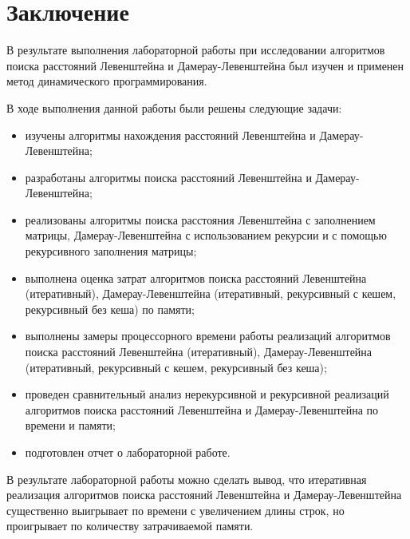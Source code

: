 \chapter*{Заключение}

В результате выполнения лабораторной работы при исследовании алгоритмов поиска расстояний Левенштейна и Дамерау-Левенштейна был изучен и применен метод динамического программирования.

В ходе выполнения данной работы были решены следующие задачи:

\begin{itemize}
    \item изучены алгоритмы нахождения расстояний Левенштейна и Дамерау-Левенштейна;
	\item разработаны алгоритмы поиска расстояний Левенштейна и Дамерау-Левенштейна;
	\item реализованы алгоритмы поиска расстояния Левенштейна с заполнением матрицы, Дамерау-Левенштейна с использованием рекурсии и с помощью рекурсивного заполнения матрицы;
	\item выполнена оценка затрат алгоритмов поиска расстояний Левенштейна (итеративный), Дамерау-Левенштейна (итеративный, рекурсивный с кешем, рекурсивный без кеша) по памяти;
	\item выполнены замеры процессорного времени работы реализаций алгоритмов поиска расстояний Левенштейна (итеративный), Дамерау-Левенштейна (итеративный, рекурсивный с кешем, рекурсивный без кеша);
	\item проведен сравнительный анализ нерекурсивной и рекурсивной реализаций алгоритмов поиска расстояний Левенштейна и Дамерау-Левенштейна по времени и памяти;
	\item подготовлен отчет о лабораторной работе.
\end{itemize}

В результате лабораторной работы можно сделать вывод, что итеративная реализация алгоритмов поиска расстояний Левенштейна и Дамерау-Левенштейна существенно выигрывает по времени с увеличением длины строк, но проигрывает по количеству затрачиваемой памяти.
